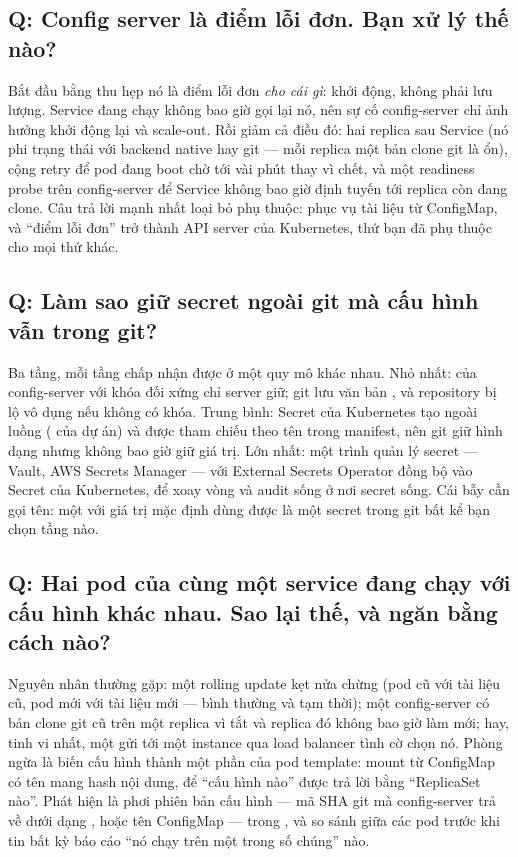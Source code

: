 \subsection*{Q: Config server là điểm lỗi đơn. Bạn xử lý thế nào?}

Bắt đầu bằng thu hẹp nó là điểm lỗi đơn \emph{cho cái gì}: khởi động,
không phải lưu lượng. Service đang chạy không bao giờ gọi lại nó, nên
sự cố config-server chỉ ảnh hưởng khởi động lại và scale-out. Rồi giảm
cả điều đó: hai replica sau Service (nó phi trạng thái với backend
native hay git --- mỗi replica một bản clone git là ổn),
 cộng retry để pod đang boot chờ tới vài phút thay vì
chết, và một readiness probe trên config-server để Service không bao
giờ định tuyến tới replica còn đang clone. Câu trả lời mạnh nhất loại
bỏ phụ thuộc: phục vụ tài liệu từ ConfigMap, và ``điểm lỗi đơn'' trở
thành API server của Kubernetes, thứ bạn đã phụ thuộc cho mọi thứ khác.

\subsection*{Q: Làm sao giữ secret ngoài git mà cấu hình vẫn trong git?}

Ba tầng, mỗi tầng chấp nhận được ở một quy mô khác nhau. Nhỏ nhất:
 của config-server với khóa đối xứng chỉ server giữ; git
lưu văn bản , và repository bị lộ vô dụng nếu không có
khóa. Trung bình: Secret của Kubernetes tạo ngoài luồng
( của dự án) và được tham chiếu theo tên trong
manifest, nên git giữ hình dạng nhưng không bao giờ giữ giá trị. Lớn
nhất: một trình quản lý secret --- Vault, AWS Secrets Manager --- với
External Secrets Operator đồng bộ vào Secret của Kubernetes, để xoay
vòng và audit sống ở nơi secret sống. Cái bẫy cần gọi tên: một
 với giá trị mặc định dùng được là một secret
trong git bất kể bạn chọn tầng nào.

\subsection*{Q: Hai pod của cùng một service đang chạy với cấu hình
khác nhau. Sao lại thế, và ngăn bằng cách nào?}

Nguyên nhân thường gặp: một rolling update kẹt nửa chừng (pod cũ với
tài liệu cũ, pod mới với tài liệu mới --- bình thường và tạm thời); một
config-server có bản clone git cũ trên một replica vì
 tắt và replica đó không bao giờ làm mới; hay,
tinh vi nhất, một  gửi tới một instance qua load
balancer tình cờ chọn nó. Phòng ngừa là biến cấu hình thành một phần
của pod template: mount từ ConfigMap có tên mang hash nội dung, để
``cấu hình nào'' được trả lời bằng ``ReplicaSet nào''. Phát hiện là
phơi phiên bản cấu hình --- mã SHA git mà config-server trả về dưới
dạng , hoặc tên ConfigMap --- trong ,
và so sánh giữa các pod trước khi tin bất kỳ báo cáo ``nó chạy trên
một trong số chúng'' nào.

